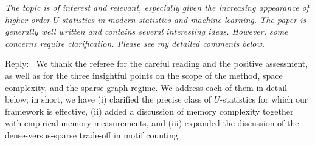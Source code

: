 \documentclass[12pt]{article}
\newenvironment{reply}{\par\smallskip\noindent\color{blue}Reply:\ \ignorespaces}{\par}
\begin{document}
\emph{The topic is of interest and relevant, especially given the increasing appearance of higher-order $U$-statistics in modern statistics and machine learning. The paper is generally well written and contains several interesting ideas. However, some concerns require clarification. Please see my detailed comments below.}

\begin{reply}
We thank the referee for the careful reading and the positive assessment, as well as for the three insightful points on the scope of the method, space complexity, and the sparse-graph regime. We address each of them in detail below; in short, we have (i) clarified the precise class of $U$-statistics for which our framework is effective, (ii) added a discussion of memory complexity together with empirical memory measurements, and (iii) expanded the discussion of the dense-versus-sparse trade-off in motif counting.
\end{reply}
\end{document}
